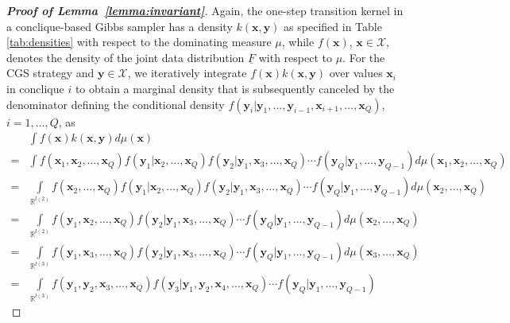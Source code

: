 \documentclass[12pt]{article}
\theoremstyle{definition}
\begin{document}
\begin{proof}[\bf Proof of Lemma~\ref{lemma:invariant}]
Again, the one-step transition kernel in a conclique-based Gibbs sampler has a density $k(\boldsymbol x, \boldsymbol y)$ as specified in Table \ref{tab:densities} with respect to the dominating measure $\mu$, while $f(\boldsymbol x)$, $\boldsymbol x \in\mathcal{X}$, denotes the density of the
joint data distribution $\underline{F}$ with respect to $\mu$.
For the CGS strategy and   $\boldsymbol y\in\mathcal{X}$, we iteratively integrate  $f(\boldsymbol x) k(\boldsymbol x, \boldsymbol y)$ over values $\boldsymbol x_i$ in conclique $i$ to obtain a marginal density  that is subsequently canceled by the denominator defining the  conditional density $f(\boldsymbol y_i| \boldsymbol y_1,  \dots, \boldsymbol y_{i-1}, \boldsymbol x_{i+1},  \dots, \boldsymbol x_Q)$, $i=1,\ldots,Q$, as
\begin{align*}
&\int f(\boldsymbol x) k(\boldsymbol x, \boldsymbol y) d\mu(\boldsymbol x)\\
= &\int    f(\boldsymbol x_1, \boldsymbol x_2, \dots, \boldsymbol x_Q) f(\boldsymbol y_1|\boldsymbol x_2, \dots, \boldsymbol x_Q)f(\boldsymbol y_2 | \boldsymbol y_1, \boldsymbol x_3, \dots, \boldsymbol x_Q) \cdots f(\boldsymbol y_Q|\boldsymbol y_1, \dots, \boldsymbol y_{Q-1})
d \mu(\boldsymbol x_1, \boldsymbol x_2, \dots, \boldsymbol x_Q)\\
=&\int\limits_{\mathbb{R}^{l(2)}}   f(\boldsymbol x_2, \dots, \boldsymbol x_Q) f(\boldsymbol y_1|\boldsymbol x_2, \dots, \boldsymbol x_Q)f(\boldsymbol y_2 | \boldsymbol y_1, \boldsymbol x_3, \dots, \boldsymbol x_Q) \cdots f(\boldsymbol y_Q|\boldsymbol y_1, \dots, \boldsymbol y_{Q-1})
d \mu( \boldsymbol x_2, \dots, \boldsymbol x_Q)\\
=&\int\limits_{\mathbb{R}^{l(2)}}    f(\boldsymbol y_1,\boldsymbol x_2, \dots, \boldsymbol x_Q)f(\boldsymbol y_2 | \boldsymbol y_1, \boldsymbol x_3, \dots, \boldsymbol x_Q) \cdots f(\boldsymbol y_Q|\boldsymbol y_1, \dots, \boldsymbol y_{Q-1})
d \mu( \boldsymbol x_2, \dots, \boldsymbol x_Q)\\
=&\int\limits_{\mathbb{R}^{l(3)}}    f(\boldsymbol y_1,\boldsymbol x_3, \dots, \boldsymbol x_Q)f(\boldsymbol y_2 | \boldsymbol y_1, \boldsymbol x_3, \dots, \boldsymbol x_Q) \cdots f(\boldsymbol y_Q|\boldsymbol y_1, \dots, \boldsymbol y_{Q-1})
d \mu( \boldsymbol x_3, \dots, \boldsymbol x_Q)\\
=&\int\limits_{\mathbb{R}^{l(3)}}    f(\boldsymbol y_1,\boldsymbol y_2,\boldsymbol x_3, \dots, \boldsymbol x_Q)f(\boldsymbol y_3 | \boldsymbol y_1, \boldsymbol y_2,\boldsymbol x_4, \dots, \boldsymbol x_Q) \cdots f(\boldsymbol y_Q|\boldsymbol y_1, \dots, \boldsymbol y_{Q-1})

\end{align*}
\end{proof}
\end{document}
